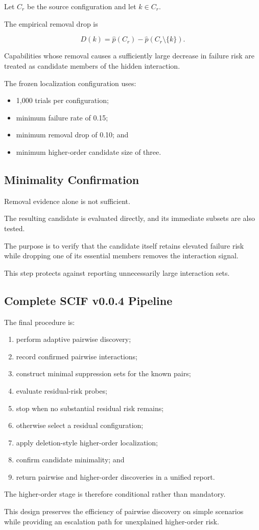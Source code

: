 Let \(C_r\) be the source configuration and let \(k \in C_r\).

The empirical removal drop is

\[
D(k)
=
\hat{p}(C_r)
-
\hat{p}(C_r \setminus \{k\}).
\]

Capabilities whose removal causes a sufficiently large decrease in failure risk are treated as candidate members of the hidden interaction.

The frozen localization configuration uses:

\begin{itemize}
\tightlist
\item
  1,000 trials per configuration;
\item
  minimum failure rate of 0.15;
\item
  minimum removal drop of 0.10; and
\item
  minimum higher-order candidate size of three.
\end{itemize}

\subsection{Minimality Confirmation}

Removal evidence alone is not sufficient.

The resulting candidate is evaluated directly, and its immediate subsets are also tested.

The purpose is to verify that the candidate itself retains elevated failure risk while dropping one of its essential members removes the interaction signal.

This step protects against reporting unnecessarily large interaction sets.

\subsection{Complete SCIF v0.0.4 Pipeline}

The final procedure is:

\begin{enumerate}
\def\labelenumi{\arabic{enumi}.}
\tightlist
\item
  perform adaptive pairwise discovery;
\item
  record confirmed pairwise interactions;
\item
  construct minimal suppression sets for the known pairs;
\item
  evaluate residual-risk probes;
\item
  stop when no substantial residual risk remains;
\item
  otherwise select a residual configuration;
\item
  apply deletion-style higher-order localization;
\item
  confirm candidate minimality; and
\item
  return pairwise and higher-order discoveries in a unified report.
\end{enumerate}

The higher-order stage is therefore conditional rather than mandatory.

This design preserves the efficiency of pairwise discovery on simple scenarios while providing an escalation path for unexplained higher-order risk.
